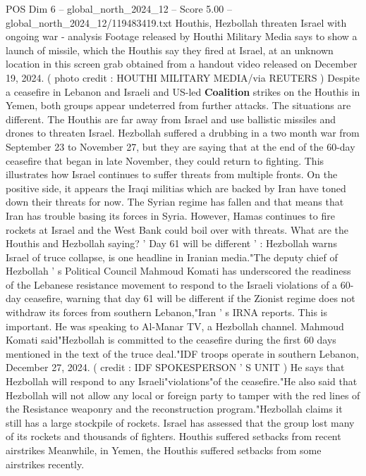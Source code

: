 \begin{textsample}{POS Dim 6 – global\_north\_2024\_12 – Score 5.00 – global\_north\_2024\_12/119483419.txt}  \label{ex:f6_pos_265}
Houthis, Hezbollah threaten Israel with ongoing war - analysis Footage released by Houthi Military Media says to show a launch of missile, which the Houthis say they fired at Israel, at an unknown location in this screen grab obtained from a handout video released on December 19, 2024. ( photo credit : HOUTHI MILITARY MEDIA/via REUTERS ) Despite a ceasefire in Lebanon and Israeli and US-led \textbf{Coalition} strikes on the Houthis in Yemen, both groups appear undeterred from further attacks.
The situations are different.
The Houthis are far away from Israel and use ballistic missiles and drones to threaten Israel.
Hezbollah suffered a drubbing in a two month war from September 23 to November 27, but they are saying that at the end of the 60-day ceasefire that began in late November, they could return to fighting.
This illustrates how Israel continues to suffer threats from multiple fronts.
On the positive side, it appears the Iraqi militias which are backed by Iran have toned down their threats for now.
The Syrian regime has fallen and that means that Iran has trouble basing its forces in Syria.
However, Hamas continues to fire rockets at Israel and the West Bank could boil over with threats.
What are the Houthis and Hezbollah saying? ' Day 61 will be different ' : Hezbollah warns Israel of truce collapse, is one headline in Iranian media."The deputy chief of Hezbollah ' s Political Council Mahmoud Komati has underscored the readiness of the Lebanese resistance movement to respond to the Israeli violations of a 60-day ceasefire, warning that day 61 will be different if the Zionist regime does not withdraw its forces from southern Lebanon,"Iran ' s IRNA reports.
This is important.
He was speaking to Al-Manar TV, a Hezbollah channel.
Mahmoud Komati said"Hezbollah is committed to the ceasefire during the first 60 days mentioned in the text of the truce deal."IDF troops operate in southern Lebanon, December 27, 2024. ( credit : IDF SPOKESPERSON ' S UNIT ) He says that Hezbollah will respond to any Israeli"violations"of the ceasefire."He also said that Hezbollah will not allow any local or foreign party to tamper with the red lines of the Resistance weaponry and the reconstruction program."Hezbollah claims it still has a large stockpile of rockets.
Israel has assessed that the group lost many of its rockets and thousands of fighters.
Houthis suffered setbacks from recent airstrikes Meanwhile, in Yemen, the Houthis suffered setbacks from some airstrikes recently.

\end{textsample}
